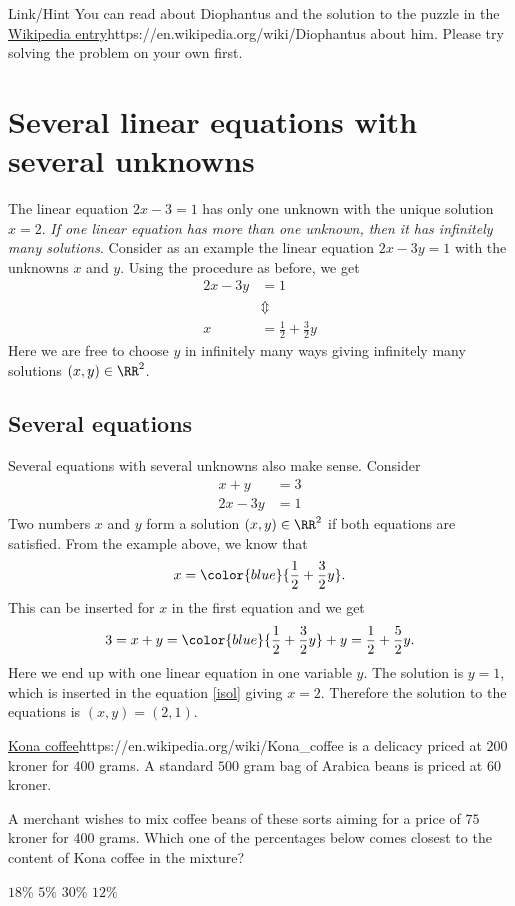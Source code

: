 \documentclass{article}
\begin{document}
\begin{hideinbutton}{Link/Hint}
  You can read about Diophantus and the solution to the puzzle in the \url{Wikipedia entry}{https://en.wikipedia.org/wiki/Diophantus} about him. Please
  try solving the problem on your own first.
\end{hideinbutton}
\endshex


\section{Several linear equations with several unknowns}

The linear equation $2 x - 3 = 1$ has only one unknown with the unique solution
$x=2$. \emph{If one linear equation has more than one unknown, then it has
  infinitely many solutions}. Consider as an example the linear equation
$2 x - 3 y = 1$ with the unknowns $x$ and $y$.
Using the procedure as before, we get
\begin{align*}
2 x - 3 y &= 1\\
&\Updownarrow\\
x &= \frac{1}{2} + \frac{3}{2} y
\end{align*}
Here we are free to choose $y$ in infinitely many ways giving
infinitely many solutions $(x, y)\in \RR^2$.

\subsection{Several equations}

Several equations with several unknowns also make sense. Consider
\begin{align*}
x + y &= 3\\
2 x - 3 y &= 1
\end{align*}
Two numbers $x$ and $y$ form a solution $(x, y)\in \RR^2$ if both equations are satisfied.
From the example above, we know that 
\begin{equation}\label{isol}
x = \color{blue}{\frac{1}{2} + \frac{3}{2} y}. 
\end{equation}
This can be inserted for $x$ in the first equation and we get
$$
3 = x + y = \color{blue}{\frac{1}{2} + \frac{3}{2} y} + y = \frac{1}{2} + \frac{5}{2} y.
$$
Here we end up with one linear equation in one variable $y$.
The solution is $y=1$, which is inserted in the equation \eqref{isol} giving
$x = 2$. Therefore the solution to the equations is $(x, y) = (2, 1)$.

\begin{quizexercise}[showhide]
\begin{quiz}
  \question
  \url{Kona coffee}{https://en.wikipedia.org/wiki/Kona_coffee} is a delicacy priced at $200$ kroner for $400$ grams.
  A standard $500$ gram bag of Arabica beans is priced at $60$ kroner.

  A merchant wishes to mix coffee beans of these sorts aiming for a price of
  $75$ kroner for $400$ grams. Which one of the percentages below
  comes closest to the content of Kona coffee in the mixture?
  
$18\%$
$5\%$
$30\%$
$12\%$
\end{quiz}
\end{quizexercise}
\end{document}
